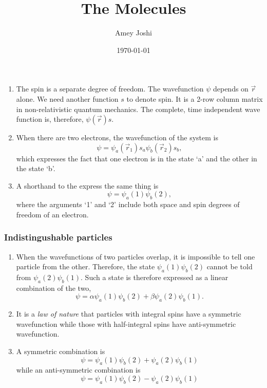 \documentclass{beamer}
\title{The Molecules}
\author{Amey Joshi}
\date{\today}
\begin{document}
\begin{frame}
\titlepage
\end{frame}

\begin{frame}
\begin{enumerate}
\frametitle{Many-electron systems}
\item The spin is a separate degree of freedom. The wavefunction $\psi$ depends
on $\vec{r}$ alone. We need another function $s$ to denote spin. It is a 2-row
column matrix in non-relativistic quantum mechanics. The complete, time 
independent wave function is, therefore, $\psi(\vec{r})s$.
\item When there are two electrons, the wavefunction of the system is 
\begin{equation}\label{e1}
\psi = \psi_a(\vec{r}_1)s_a\psi_b(\vec{r}_2)s_b,
\end{equation}
which expresses the fact that one electron is in the state `a' and the other in 
the state `b'.
\item A shorthand to the express the same thing is
\begin{equation}\label{e2}
\psi = \psi_a(1)\psi_b(2),
\end{equation}
where the arguments `1' and `2' include both space and spin degrees of freedom 
of an electron.
\end{enumerate}
\end{frame}

\begin{frame}
\frametitle{Indistingushable particles}
\begin{enumerate}
\item When the wavefunctions of two particles overlap, it is impossible to tell
one particle from the other. Therefore, the state $\psi_a(1)\psi_b(2)$ cannot be
told from $\psi_a(2)\psi_b(1)$. Such a state is therefore expressed as a linear
combination of the two,
\begin{equation}\label{e3}
\psi = \alpha\psi_a(1)\psi_b(2) + \beta\psi_a(2)\psi_b(1).
\end{equation}
\item It is a \emph{law of nature} that particles with integral spins have a 
symmetric wavefunction while those with half-integral spins have anti-symmetric
wavefunction.
\item A symmetric combination is
\begin{equation}\label{e4}
\psi = \psi_a(1)\psi_b(2) + \psi_a(2)\psi_b(1)
\end{equation}
while an anti-symmetric combination is
\begin{equation}\label{e5}
\psi = \psi_a(1)\psi_b(2) - \psi_a(2)\psi_b(1)
\end{equation}
\end{enumerate}
\end{frame}
\end{document}
